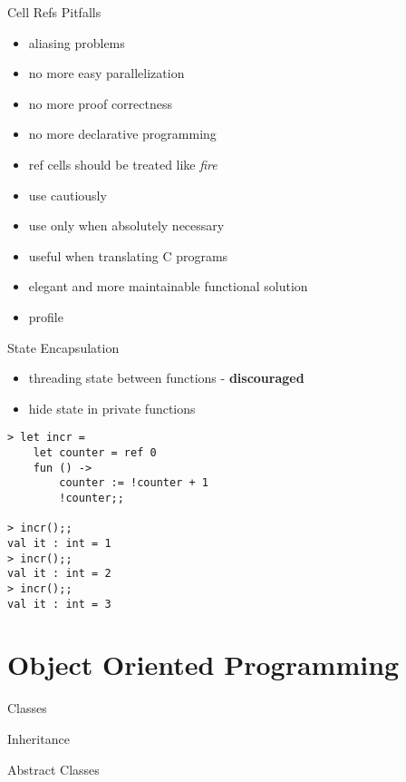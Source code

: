 \documentclass{beamer}
\begin{document}
\begin{frame}{Cell Refs Pitfalls}
  \begin{itemize}[<+->]
    \item aliasing problems
    \item no more easy parallelization
    \item no more proof correctness
    \item no more declarative programming
    \item ref cells should be treated like \textit{fire}
    \item use cautiously
    \item use only when absolutely necessary
    \pause
    \item useful when translating C programs
    \item elegant and more maintainable functional solution
    \item profile
  \end{itemize}
\end{frame}

\begin{frame}[fragile]{State Encapsulation}
  \begin{itemize}[<+->]
    \item threading state between functions - \textbf{discouraged}
    \item hide state in private functions
  \end{itemize}
  \pause
  \begin{verbatim}
> let incr =
    let counter = ref 0
    fun () ->
        counter := !counter + 1
        !counter;;

> incr();;
val it : int = 1
> incr();;
val it : int = 2
> incr();;
val it : int = 3
  \end{verbatim}
\end{frame}

\section{Object Oriented Programming}
\frame{\tableofcontents[currentsection]}

\begin{frame}{Classes}
\end{frame}

\begin{frame}{Inheritance}
\end{frame}

\begin{frame}{Abstract Classes}
\end{frame}
\end{document}
